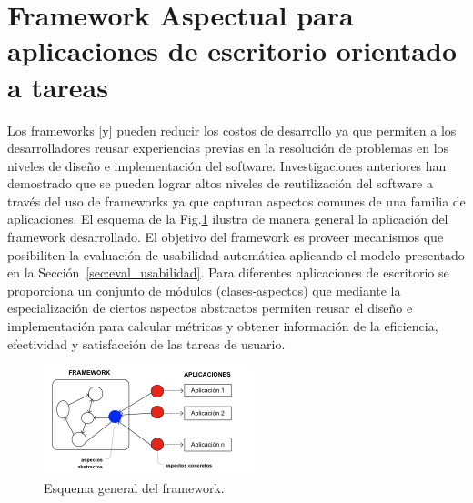 \section{Framework Aspectual para aplicaciones de escritorio orientado a tareas}
\label{sec:framework_aspectual}

Los frameworks [y] pueden reducir los costos de desarrollo ya que permiten a los desarrolladores reusar experiencias previas en la resolución de problemas en los niveles de diseño e implementación del software. Investigaciones anteriores han demostrado que se pueden lograr altos niveles de reutilización del software a través del uso de frameworks ya que capturan aspectos comunes de una familia de aplicaciones. 
El esquema de la Fig.\ref{fig:fig2} ilustra de manera general la aplicación del framework desarrollado. El objetivo del framework es proveer mecanismos que posibiliten la evaluación de usabilidad automática aplicando el modelo presentado en la Sección~\ref{sec:eval_usabilidad}. Para diferentes aplicaciones de escritorio se proporciona un conjunto de módulos (clases-aspectos) que mediante la especialización de ciertos aspectos abstractos permiten reusar el diseño e implementación para calcular métricas y obtener información de la eficiencia, efectividad y satisfacción de las tareas de usuario.

\begin{figure}[ht!]
	\centering
	\includegraphics[scale=1]{figs/fig2.png}
	\caption{\label{fig:fig2} Esquema general del framework.}
\end{figure}


